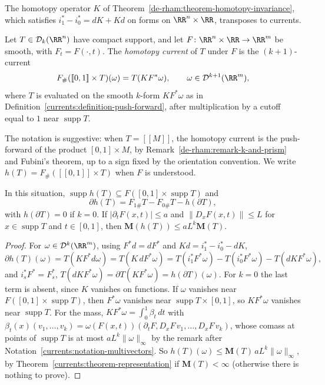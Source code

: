 The homotopy operator $K$ of Theorem~\ref{de-rham:theorem-homotopy-invariance}, which satisfies $i_1^* - i_0^* = dK + Kd$ on forms on $\RR^n \times \RR$, transposes to currents.

\begin{definition}\label{currents:definition-homotopy-current}
Let $T \in \mathcal{D}_k(\RR^n)$ have compact support, and let $F \colon \RR^n \times \RR \to \RR^m$ be smooth, with $F_t = F(\cdot, t)$. The \emph{homotopy current} of $T$ under $F$ is the $(k+1)$-current
\[
F_\#([\![0, 1]\!] \times T)(\omega) = T(K F^*\omega), \qquad \omega \in \mathcal{D}^{k+1}(\RR^m),
\]
where $T$ is evaluated on the smooth $k$-form $KF^*\omega$ as in Definition~\ref{currents:definition-push-forward}, after multiplication by a cutoff equal to $1$ near $\operatorname{supp}T$.
\end{definition}

The notation is suggestive: when $T = [\![M]\!]$, the homotopy current is the push-forward of the product $[0, 1] \times M$, by Remark~\ref{de-rham:remark-k-and-prism} and Fubini's theorem, up to a sign fixed by
the orientation convention. We write $h(T) = F_\#([\![0, 1]\!] \times T)$ when $F$ is understood.

\begin{proposition}\label{currents:proposition-homotopy-formula}
In this situation, $\operatorname{supp}h(T) \subseteq F([0, 1] \times \operatorname{supp}T)$ and
\[
\partial h(T) = F_{1\#}T - F_{0\#}T - h(\partial T),
\]
with $h(\partial T) = 0$ if $k = 0$. If $|\partial_tF(x, t)| \leq a$ and $\|D_xF(x, t)\| \leq L$ for $x \in \operatorname{supp}T$ and $t \in [0, 1]$, then $\mathbf{M}(h(T)) \leq aL^k\mathbf{M}(T)$.
\end{proposition}

\begin{proof}
For $\omega \in \mathcal{D}^k(\RR^m)$, using $F^*d = dF^*$ and $Kd = i_1^* - i_0^* - dK$,
\[
\partial h(T)(\omega) = T(KF^*d\omega) = T(K\,dF^*\omega) = T(i_1^*F^*\omega) - T(i_0^*F^*\omega) - T(dKF^*\omega),
\]
and $i_s^*F^* = F_s^*$, $T(dKF^*\omega) = \partial T(KF^*\omega) = h(\partial T)(\omega)$. For $k = 0$ the last term is absent, since $K$ vanishes on functions. If $\omega$ vanishes near $F([0, 1] \times \operatorname{supp}T)$, then $F^*\omega$ vanishes near $\operatorname{supp}T \times [0, 1]$, so $KF^*\omega$ vanishes near
$\operatorname{supp}T$. For the mass, $KF^*\omega = \int_0^1\beta_t\,dt$ with $\beta_t(x)(v_1, \ldots, v_k) = \omega(F(x, t))(\partial_tF, D_xF\,v_1, \ldots, D_xF\,v_k)$, whose comass at points of $\operatorname{supp}T$ is at
most $aL^k\|\omega\|_\infty$ by the remark after Notation~\ref{currents:notation-multivectors}. So $h(T)(\omega) \leq \mathbf{M}(T)\,aL^k\|\omega\|_\infty$, by Theorem~\ref{currents:theorem-representation} if $\mathbf{M}(T) < \infty$
(otherwise there is nothing to prove).
\end{proof}

